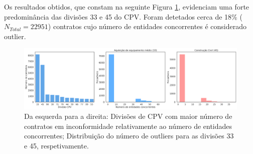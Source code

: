 Os resultados obtidos, que constam na seguinte Figura \ref{fig:necincump}, evidenciam uma forte predominância das divisões 33 e 45 do CPV. Foram detetados cerca de 18\% ($N_{Total} = 22951$) contratos cujo número de entidades concorrentes é considerado outlier. 

\begin{figure}[H]
	\centering
	\includegraphics[width=\textwidth]{imagens/r019/colecao.png}
	\caption{Da esquerda para a direita: Divisões de CPV com maior número de contratos em inconformidade relativamente ao número de entidades concorrentes; Distribuição do número de outliers para as divisões 33 e 45, respetivamente.}
	\label{fig:necincump}
\end{figure}



